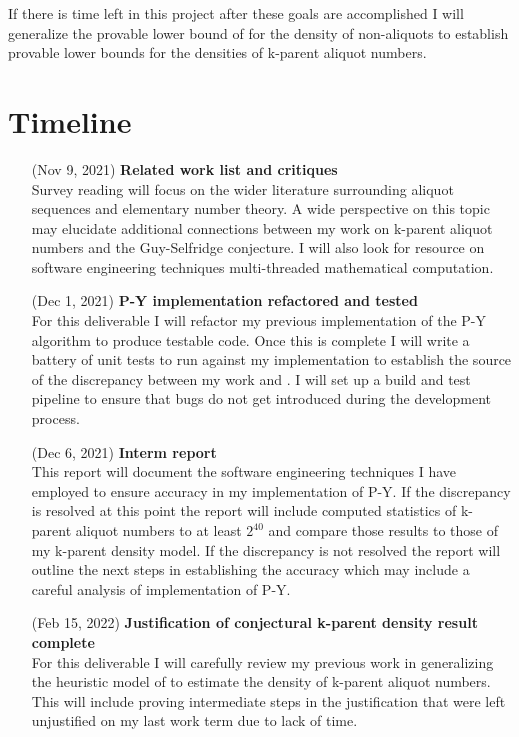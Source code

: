 \documentclass{article}
\theoremstyle{definition}
\begin{document}
If there is time left in this project after these goals are accomplished I will generalize the provable lower bound of \cite{chen_zhao_2011} for the density of non-aliquots to establish provable lower bounds for the densities of k-parent aliquot numbers. 

\section{Timeline}
\begin{itemize}
    \item[(Nov 9, 2021)] \textbf{Related work list and critiques}\\
    Survey reading will focus on the wider literature surrounding aliquot sequences and elementary number theory. A wide perspective on this topic may elucidate additional connections between my work on k-parent aliquot numbers and the Guy-Selfridge conjecture. I will also look for resource on software engineering techniques multi-threaded mathematical computation.
    \item[(Dec 1, 2021)] \textbf{P-Y implementation refactored and tested}\\
    For this deliverable I will refactor my previous implementation of the P-Y algorithm to produce testable code. Once this is complete I will write a battery of unit tests to run against my implementation to establish the source of the discrepancy between my work and \cite{chum_guy_jacobson_mosunov_2018}. I will set up a build and test pipeline to ensure that bugs do not get introduced during the development process.
    \item[(Dec 6, 2021)] \textbf{Interm report} \\ 
    This report will document the software engineering techniques I have employed to ensure accuracy in my implementation of P-Y. If the discrepancy is resolved at this point the report will include computed statistics of k-parent aliquot numbers to at least $2^{40}$ and compare those results to those of my k-parent density model. If the discrepancy is not resolved the report will outline the next steps in establishing the accuracy which may include a careful analysis of \cite{chum_guy_jacobson_mosunov_2018} implementation of P-Y.
    \item[(Feb 15, 2022)] \textbf{Justification of conjectural k-parent density result complete}\\
    For this deliverable I will carefully review my previous work in generalizing the heuristic model of \cite{pollPom} to estimate the density of k-parent aliquot numbers. This will include proving intermediate steps in the justification that were left unjustified on my last work term due to lack of time.  

\end{itemize}
\end{document}
